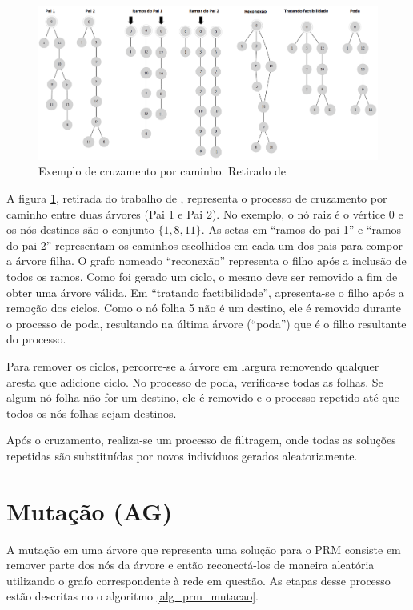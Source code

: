 \begin{figure}[!htbp]
	\label{fig_prm-cruzamento-caminho}
	\centering
	\includegraphics[width=1\textwidth]{cap_estrategias-prm/figs/prm-cruzamento-caminho}
	\caption{Exemplo de cruzamento por caminho. Retirado de \cite{LafetaThesis}}
\end{figure}

A figura \ref{fig_prm-cruzamento-caminho}, retirada do trabalho de \cite{Lafeta2016}, representa o processo de cruzamento por caminho entre duas árvores (Pai 1 e Pai 2). No exemplo, o nó raiz é o vértice 0 e os nós destinos são o conjunto $\{1, 8, 11\}$. As setas em ``ramos do pai 1'' e ``ramos do pai 2'' representam os caminhos escolhidos em cada um dos pais para compor a árvore filha. O grafo nomeado ``reconexão'' representa o filho após a inclusão de todos os ramos. Como foi gerado um ciclo, o mesmo deve ser removido a fim de obter uma árvore válida. Em ``tratando factibilidade'', apresenta-se o filho após a remoção dos ciclos. Como o nó folha 5 não é um destino, ele é removido durante o processo de poda, resultando na última árvore (``poda'') que é o filho resultante do processo.

Para remover os ciclos, percorre-se a árvore em largura removendo qualquer aresta que adicione ciclo. No processo de poda, verifica-se todas as folhas. Se algum nó folha não for um destino, ele é removido e o processo repetido até que todos os nós folhas sejam destinos.

Após o cruzamento, realiza-se um processo de filtragem, onde todas as soluções repetidas são substituídas por novos indivíduos gerados aleatoriamente.

\section{Mutação (AG)}

A mutação em uma árvore que representa uma solução para o PRM consiste em remover parte dos nós da árvore e então reconectá-los de maneira aleatória utilizando o grafo correspondente à rede em questão. As etapas desse processo estão descritas no o algoritmo \ref{alg_prm_mutacao}.

